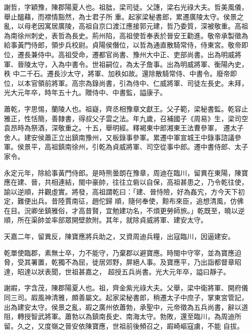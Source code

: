 
\begin{pinyinscope}

 謝哲，字穎豫，陳郡陽夏人也。祖朏，梁司徒。父譓，梁右光祿大夫。哲美風儀，舉止醞藉，而襟情豁然，為士君子所
 重。起家梁秘書郎，累遷廣陵太守。侯景之亂，以母老因寓居廣陵，高祖自京口渡江應接郭元建，哲乃委質，深被敬重。高祖為南徐州刺史，表哲為長史。荊州陷，高祖使哲奉表於晉安王勸進。敬帝承製徵為給事黃門侍郎，領步兵校尉。貞陽侯僭位，以哲為通直散騎常侍，侍東宮。敬帝即位，遷長兼侍中。高祖受命，遷都官尚書、豫州大中正、吏部尚書。出為明威將軍、晉陵太守，入為中書令。世祖嗣位，為太子詹事。出為明威將軍、衡陽內史，秩
 中二千石。遷長沙太守，將軍、加秩如故。還除散騎常侍、中書令。廢帝即位，以本官領前將軍。高宗為錄尚書，引為侍中、仁威將軍、司徒左長史。未拜，光大元年卒，時年五十九。贈侍中、中書監，謚康子。



 蕭乾，字思惕，蘭陵人也。祖嶷，齊丞相豫章文獻王。父子範，梁秘書監。乾容止雅正，性恬簡，善隸書，得叔父子雲之法。年九歲，召補國子《周易》生，梁司空袁昂時為祭酒，深敬重之。十五，舉明經。釋褐東中郎湘東王法曹參軍，
 遷太子舍人。建安侯蕭正立出鎮南豫州，又板錄事參軍。累遷中軍宣城王中錄事諮議參軍。侯景平，高祖鎮南徐州，引乾為貞威將軍、司空從事中郎。遷中書侍郎、太子家令。



 永定元年，除給事黃門侍郎。是時熊曇朗在豫章，周迪在臨川，留異在東陽，陳寶應在建、晉，共相連結，閩中豪帥，往往立砦以自保，高祖甚患之，乃令乾往使，諭以逆順，并觀虛實。將發，高祖謂乾曰：「建、晉恃險，好為姦宄，方今天下初定，難便出兵。昔陸賈南征，趙佗歸
 順，隨何奉使，黥布來臣，追想清風，仿佛在目。況卿坐鎮雅俗，才高昔賢，宜勉建功名，不煩更勞師旅。」乾既至，曉以逆順，所在渠帥並率部眾開壁款附。其年，就除貞威將軍、建安太守。



 天嘉二年，留異反，陳寶應將兵助之，又資周迪兵糧，出寇臨川，因逼建安。



 乾單使臨郡，素無士卒，力不能守，乃棄郡以避寶應。時閩中守宰，並為寶應迫脅，受其署置，乾獨不為屈，徙居郊野，屏絕人事。及寶應平，乃出詣都督章昭達，昭達以狀表聞，世祖甚嘉之，
 超授五兵尚書。光大元年卒，謚曰靜子。



 謝嘏，字含茂，陳郡陽夏人也。祖，齊金紫光祿大夫。父舉，梁中衛將軍、開府儀同三司。嘏風神清雅，頗善屬文。起家梁秘書郎，稍遷太子中庶子，掌東宮管記，出為建安太守。侯景之亂，嘏之廣州依蕭勃，承聖中，元帝徵為五兵尚書，辭以道阻，轉授智武將軍。蕭勃以為鎮南長史、南海太守。勃敗，還至臨川，為周迪所留。久之，又度嶺之晉安依陳寶應，世祖前後頻召之，嘏崎嶇寇虜，不能
 自拔。




\end{pinyinscope}
